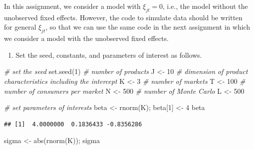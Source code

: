 \documentclass[
]{book}
\newenvironment{Shaded}{\begin{snugshade}}{\end{snugshade}}
\newcommand{\CommentTok}[1]{\textcolor[rgb]{0.56,0.35,0.01}{\textit{#1}}}
\newcommand{\DecValTok}[1]{\textcolor[rgb]{0.00,0.00,0.81}{#1}}
\newcommand{\FunctionTok}[1]{\textcolor[rgb]{0.00,0.00,0.00}{#1}}
\newcommand{\NormalTok}[1]{#1}
\newcommand{\OtherTok}[1]{\textcolor[rgb]{0.56,0.35,0.01}{#1}}
\providecommand{\tightlist}{%
  \setlength{\itemsep}{0pt}\setlength{\parskip}{0pt}}
\begin{document}
In this assignment, we consider a model with \(\xi_{jt} = 0\), i.e., the model without the unobserved fixed effects. However, the code to simulate data should be written for general \(\xi_{jt}\), so that we can use the same code in the next assignment in which we consider a model with the unobserved fixed effects.

\begin{enumerate}
\def\labelenumi{\arabic{enumi}.}
\tightlist
\item
  Set the seed, constants, and parameters of interest as follows.
\end{enumerate}

\begin{Shaded}
\begin{Highlighting}[]
\CommentTok{\# set the seed}
\FunctionTok{set.seed}\NormalTok{(}\DecValTok{1}\NormalTok{)}
\CommentTok{\# number of products}
\NormalTok{J }\OtherTok{\textless{}{-}} \DecValTok{10}
\CommentTok{\# dimension of product characteristics including the intercept}
\NormalTok{K }\OtherTok{\textless{}{-}} \DecValTok{3}
\CommentTok{\# number of markets}
\NormalTok{T }\OtherTok{\textless{}{-}} \DecValTok{100}
\CommentTok{\# number of consumers per market}
\NormalTok{N }\OtherTok{\textless{}{-}} \DecValTok{500}
\CommentTok{\# number of Monte Carlo}
\NormalTok{L }\OtherTok{\textless{}{-}} \DecValTok{500}
\end{Highlighting}
\end{Shaded}

\begin{Shaded}
\begin{Highlighting}[]
\CommentTok{\# set parameters of interests}
\NormalTok{beta }\OtherTok{\textless{}{-}} \FunctionTok{rnorm}\NormalTok{(K); }
\NormalTok{beta[}\DecValTok{1}\NormalTok{] }\OtherTok{\textless{}{-}} \DecValTok{4}
\NormalTok{beta}
\end{Highlighting}
\end{Shaded}

\begin{verbatim}
## [1]  4.0000000  0.1836433 -0.8356286
\end{verbatim}

\begin{Shaded}
\begin{Highlighting}[]
\NormalTok{sigma }\OtherTok{\textless{}{-}} \FunctionTok{abs}\NormalTok{(}\FunctionTok{rnorm}\NormalTok{(K)); sigma}
\end{Highlighting}
\end{Shaded}
\end{document}
